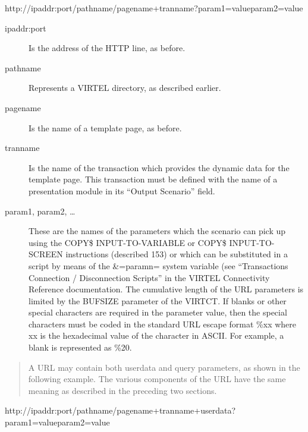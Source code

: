 \documentclass[letterpaper,10pt,english]{sphinxmanual}
\begin{document}
\begin{sphinxVerbatim}[commandchars=\\\{\}]
http://ipaddr:port/pathname/pagename+tranname?param1=value\PYGZam{}param2=value
\end{sphinxVerbatim}
\begin{description}
\item[{ipaddr:port}] \leavevmode
Is the address of the HTTP line, as before.

\item[{pathname}] \leavevmode
Represents a VIRTEL directory, as described earlier.

\item[{pagename}] \leavevmode
Is the name of a template page, as before.

\item[{tranname}] \leavevmode
Is the name of the transaction which provides the dynamic data for
the template page. This transaction must be defined with the name of
a presentation module in its “Output Scenario” field.

\item[{param1, param2, …}] \leavevmode
These are the names of the parameters which the scenario can pick up using
the COPY\$ INPUT-TO-VARIABLE or COPY\$ INPUT-TO-SCREEN instructions
(described 153) or which can be substituted in a script by means of
the \&=paramn= system variable (see “Transactions \textendash{} Connection /
Disconnection Scripts” in the VIRTEL Connectivity Reference
documentation. The cumulative length of the URL parameters is
limited by the BUFSIZE parameter of the VIRTCT. If blanks or other
special characters are required in the parameter value, then the
special characters must be coded in the standard URL escape format
\%xx where xx is the hexadecimal value of the character in ASCII. For
example, a blank is represented as \%20.

\end{description}

\begin{quote}

A URL may contain both userdata and query parameters, as shown in
the following example. The various components of the URL have the
same meaning as described in the preceding two sections.
\end{quote}

\begin{sphinxVerbatim}[commandchars=\\\{\}]
http://ipaddr:port/pathname/pagename+tranname+userdata?param1=value\PYGZam{}param2=value
\end{sphinxVerbatim}
\end{document}
